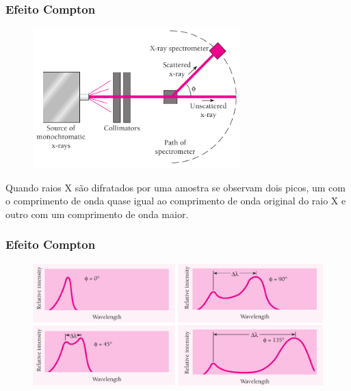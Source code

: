 \documentclass[12pt,brazil]{beamer}
\begin{document}
\begin{frame}
  \frametitle{Efeito Compton}
        \vspace*{-0.75cm}
        \begin{figure}
          \includegraphics[width=8cm]{figuras/fig18}
        \end{figure}
        
      \fontsize{10pt}{11pt}\selectfont
        Quando raios X são difratados por uma amostra se observam dois picos, um com o comprimento de onda quase igual ao comprimento de onda original do raio X e outro com um comprimento de onda maior.

\end{frame}


\begin{frame}
  \frametitle{Efeito Compton}
        \begin{figure}
          \includegraphics[width=12cm]{figuras/fig19}
        \end{figure}

\end{frame}

\end{document}
